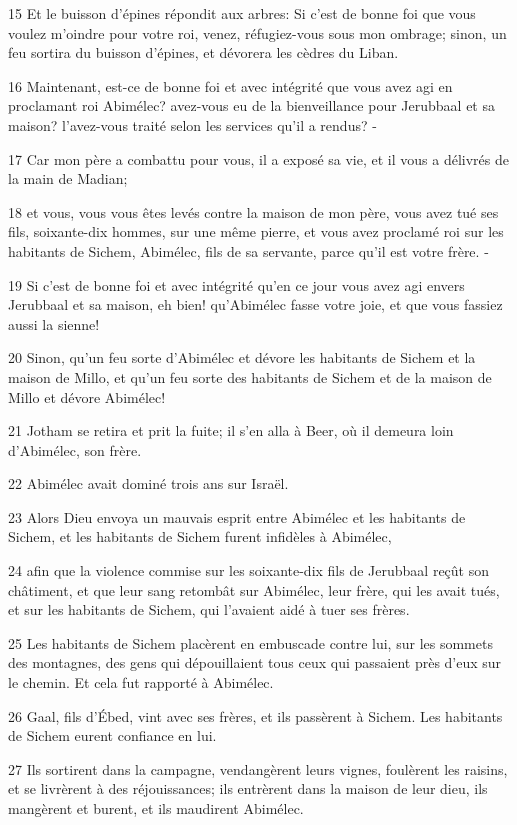 \par 15 Et le buisson d'épines répondit aux arbres: Si c'est de bonne foi que vous voulez m'oindre pour votre roi, venez, réfugiez-vous sous mon ombrage; sinon, un feu sortira du buisson d'épines, et dévorera les cèdres du Liban.
\par 16 Maintenant, est-ce de bonne foi et avec intégrité que vous avez agi en proclamant roi Abimélec? avez-vous eu de la bienveillance pour Jerubbaal et sa maison? l'avez-vous traité selon les services qu'il a rendus? -
\par 17 Car mon père a combattu pour vous, il a exposé sa vie, et il vous a délivrés de la main de Madian;
\par 18 et vous, vous vous êtes levés contre la maison de mon père, vous avez tué ses fils, soixante-dix hommes, sur une même pierre, et vous avez proclamé roi sur les habitants de Sichem, Abimélec, fils de sa servante, parce qu'il est votre frère. -
\par 19 Si c'est de bonne foi et avec intégrité qu'en ce jour vous avez agi envers Jerubbaal et sa maison, eh bien! qu'Abimélec fasse votre joie, et que vous fassiez aussi la sienne!
\par 20 Sinon, qu'un feu sorte d'Abimélec et dévore les habitants de Sichem et la maison de Millo, et qu'un feu sorte des habitants de Sichem et de la maison de Millo et dévore Abimélec!
\par 21 Jotham se retira et prit la fuite; il s'en alla à Beer, où il demeura loin d'Abimélec, son frère.
\par 22 Abimélec avait dominé trois ans sur Israël.
\par 23 Alors Dieu envoya un mauvais esprit entre Abimélec et les habitants de Sichem, et les habitants de Sichem furent infidèles à Abimélec,
\par 24 afin que la violence commise sur les soixante-dix fils de Jerubbaal reçût son châtiment, et que leur sang retombât sur Abimélec, leur frère, qui les avait tués, et sur les habitants de Sichem, qui l'avaient aidé à tuer ses frères.
\par 25 Les habitants de Sichem placèrent en embuscade contre lui, sur les sommets des montagnes, des gens qui dépouillaient tous ceux qui passaient près d'eux sur le chemin. Et cela fut rapporté à Abimélec.
\par 26 Gaal, fils d'Ébed, vint avec ses frères, et ils passèrent à Sichem. Les habitants de Sichem eurent confiance en lui.
\par 27 Ils sortirent dans la campagne, vendangèrent leurs vignes, foulèrent les raisins, et se livrèrent à des réjouissances; ils entrèrent dans la maison de leur dieu, ils mangèrent et burent, et ils maudirent Abimélec.
